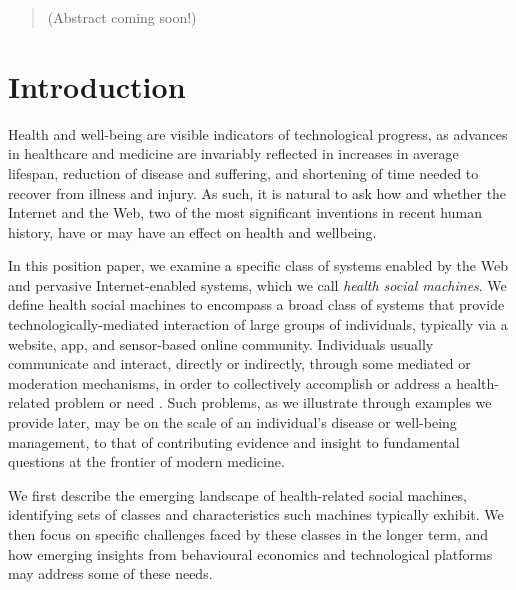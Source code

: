 \documentclass{sig-alternate}
\begin{document}
\maketitle
\begin{abstract}

(Abstract coming soon!)

\end{abstract}




\section{Introduction}

Health and well-being are visible indicators of technological
progress, as advances in healthcare and medicine are invariably
reflected in increases in average lifespan, reduction of disease and
suffering, and shortening of time needed to recover from illness and
injury.  As such, it is natural to ask how and whether the Internet
and the Web, two of the most significant inventions in recent human
history, have or may have an effect on health and wellbeing.

In this position paper, we examine a specific class of systems enabled
by the Web and pervasive Internet-enabled systems, which we call
\emph{health social machines}.  We define health social machines to
encompass a broad class of systems that provide
technologically-mediated interaction of large groups of individuals,
typically via a website, app, and sensor-based online community.
Individuals usually communicate and interact, directly or indirectly,
through some mediated or moderation mechanisms, in order to
collectively accomplish or address a health-related problem or need
\cite{hendler2010semantic}.  Such problems, as we illustrate through
examples we provide later, may be on the scale of an individual's
disease or well-being management, to that of contributing evidence and
insight to fundamental questions at the frontier of modern medicine.

We first describe the emerging landscape of health-related social
machines, identifying sets of classes and characteristics such
machines typically exhibit.  We then focus on specific challenges
faced by these classes in the longer term, and how emerging insights
from behavioural economics and technological platforms may address
some of these needs.
\end{document}
